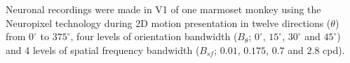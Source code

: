 \documentclass[portrait]{a0poster}
\begin{document}
\begin{minipage}{\textwidth}
\begin{minipage}{0.57\textwidth}
\begin{tcolorbox}
                \begin{minipage}{\textwidth}
                    Neuronal recordings were made in V1 of one marmoset monkey using the Neuropixel technology during 2D motion presentation in twelve directions ($\theta$) from $0^{\circ}$ to $375^{\circ}$, four levels of orientation bandwidth ($B_\theta$; $0^{\circ}$, $15^{\circ}$, $30^{\circ}$ and $45^{\circ}$) and 4 levels of spatial frequency bandwidth ($B_{sf}$; $0.01$, $0.175$, $0.7$ and $2.8$ cpd).
                \end{minipage}

\end{tcolorbox}
\end{minipage}
\end{minipage}
\end{document}
